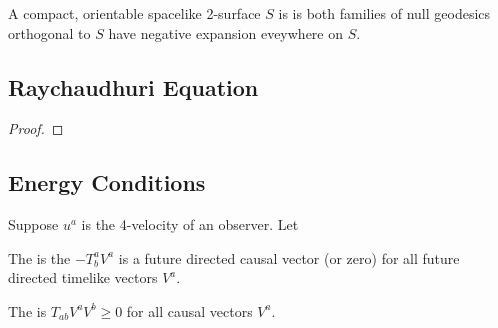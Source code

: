 \documentclass{article}
\begin{document}
\begin{definition}
A compact, orientable spacelike 2-surface $S$ is  is both families of null geodesics orthogonal to $S$ have negative expansion eveywhere on $S$.
\end{definition}

\subsection{Raychaudhuri Equation}

\begin{prop}
\end{prop}
\begin{proof}
\end{proof}

\subsection{Energy Conditions}
Suppose $u^a$ is the 4-velocity of an observer. Let

\begin{definition}
The  is the $-T^a_b V^a$ is a future directed causal vector (or zero) for all future directed timelike vectors $V^a$. 
\end{definition}

\begin{definition}
The  is $T_{ab} V^a V^b \geq 0$ for all causal vectors $V^a$. 
\end{definition}
\end{document}
